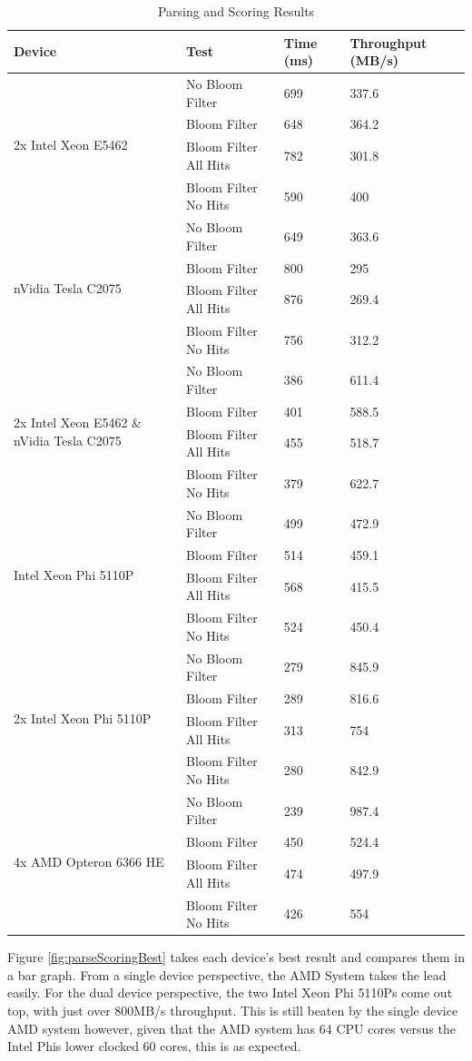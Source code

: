 \begin{table}[H]
\begin{tabular}{|l|l|l|l|}
\hline
Device & Test & Time (ms) & Throughput (MB/s)\\
\hline
\multirow{4}{*}{2x Intel Xeon E5462}
& No Bloom Filter & 699 & 337.6 \\
& Bloom Filter & 648 & 364.2 \\
& Bloom Filter All Hits & 782 & 301.8 \\
& Bloom Filter No Hits & 590 & 400 \\
\hline
\multirow{4}{*}{nVidia Tesla C2075}
& No Bloom Filter & 649 & 363.6 \\
& Bloom Filter & 800 & 295 \\
& Bloom Filter All Hits & 876 & 269.4 \\
& Bloom Filter No Hits & 756 & 312.2 \\
\hline
\multirow{4}{*}{2x Intel Xeon E5462 \& nVidia Tesla C2075}
& No Bloom Filter & 386 & 611.4 \\
& Bloom Filter & 401 & 588.5 \\
& Bloom Filter All Hits & 455 & 518.7 \\
& Bloom Filter No Hits & 379 & 622.7 \\
\hline
\multirow{4}{*}{Intel Xeon Phi 5110P}
& No Bloom Filter & 499 & 472.9 \\
& Bloom Filter & 514 & 459.1 \\
& Bloom Filter All Hits & 568 & 415.5 \\
& Bloom Filter No Hits & 524 & 450.4 \\
\hline
\multirow{4}{*}{2x Intel Xeon Phi 5110P}
& No Bloom Filter & 279 & 845.9 \\
& Bloom Filter & 289 & 816.6 \\
& Bloom Filter All Hits & 313 & 754 \\
& Bloom Filter No Hits & 280 & 842.9 \\
\hline
\multirow{4}{*}{4x AMD Opteron 6366 HE}
& No Bloom Filter & 239 & 987.4 \\
& Bloom Filter & 450 & 524.4 \\
& Bloom Filter All Hits & 474 & 497.9 \\
& Bloom Filter No Hits & 426 & 554 \\
\hline
\end{tabular}
\caption{Parsing and Scoring Results}
\label{table:parsingScoring}
\end{table}

Figure \ref{fig:parseScoringBest} takes each device's best result and compares
them in a bar graph. From a single device perspective, the AMD System takes the
lead easily. For the dual device perspective, the two Intel Xeon Phi 5110Ps come
out top, with just over 800MB/s throughput. This is still beaten by the single
device AMD system however, given that the AMD system has 64 CPU cores versus
the Intel Phis lower clocked 60 cores, this is as expected.

